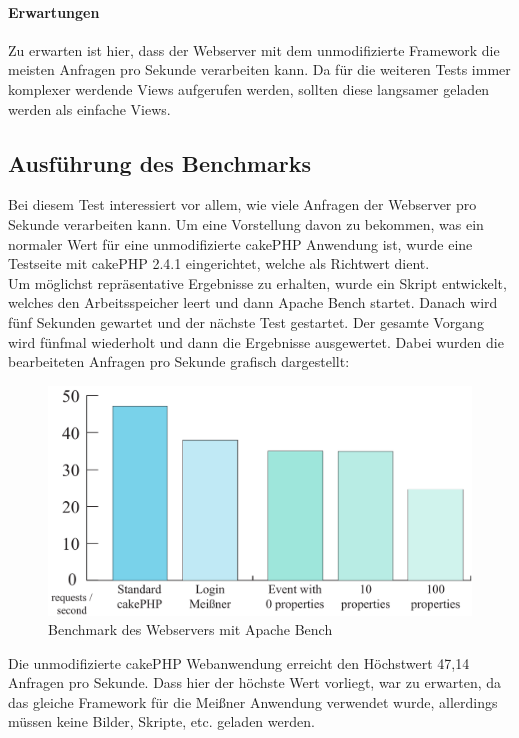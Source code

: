 \paragraph{Erwartungen}
Zu erwarten ist hier, dass der Webserver mit dem unmodifizierte Framework die meisten Anfragen pro Sekunde verarbeiten kann. Da für die weiteren Tests immer komplexer werdende Views aufgerufen werden, sollten diese langsamer geladen werden als einfache Views.

\subsection{Ausführung des Benchmarks}
Bei diesem Test interessiert vor allem, wie viele Anfragen der Webserver pro Sekunde verarbeiten kann. Um eine Vorstellung davon zu bekommen, was ein normaler Wert für eine unmodifizierte cakePHP Anwendung ist, wurde eine Testseite mit cakePHP 2.4.1 eingerichtet, welche als Richtwert dient.\\
Um möglichst repräsentative Ergebnisse zu erhalten, wurde ein Skript entwickelt, welches den Arbeitsspeicher leert und dann Apache Bench startet. Danach wird fünf Sekunden gewartet und der nächste Test gestartet. Der gesamte Vorgang wird fünfmal wiederholt und dann die Ergebnisse ausgewertet. Dabei wurden die bearbeiteten Anfragen pro Sekunde grafisch dargestellt:

\begin{figure}[!ht]
	\centering
	\includegraphics[width=15cm]{fig/ab_result}
	\caption{Benchmark des Webservers mit Apache Bench}
\end{figure}

Die unmodifizierte cakePHP Webanwendung erreicht den Höchstwert 47,14 Anfragen pro Sekunde. Dass hier der höchste Wert vorliegt, war zu erwarten, da das gleiche Framework für die Meißner Anwendung verwendet wurde, allerdings müssen keine Bilder, Skripte, etc. geladen werden.\par

